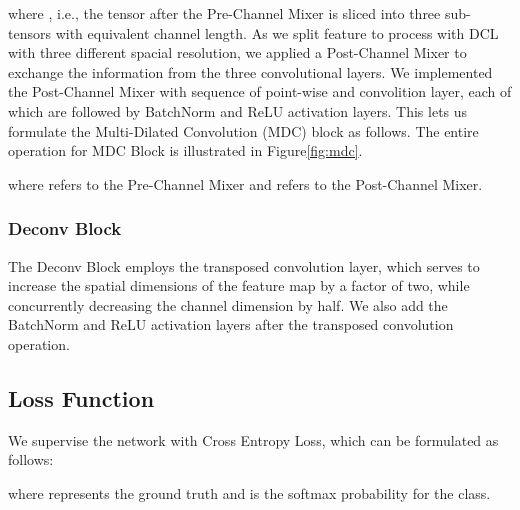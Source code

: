 \documentclass[journal]{IEEEtran}
\begin{document}
where , i.e., the tensor after the Pre-Channel Mixer  is sliced into three sub-tensors with equivalent channel length.
As we split feature to process with DCL with three different spacial resolution, we applied a Post-Channel Mixer to exchange the information from the three convolutional layers. We implemented the Post-Channel Mixer with sequence of point-wise and  convolition layer, each of which are followed by BatchNorm and ReLU activation layers.
This lets us formulate the Multi-Dilated Convolution (MDC) block as follows. The entire operation for MDC Block is illustrated in Figure\ref{fig:mdc}.


where  refers to the Pre-Channel Mixer and  refers to the Post-Channel Mixer. 



\subsubsection{Deconv Block} 
The Deconv Block employs the transposed convolution layer, which serves to increase the spatial dimensions of the feature map by a factor of two, while concurrently decreasing the channel dimension by half. We also add the BatchNorm and ReLU activation layers after the transposed convolution operation.

\subsection{Loss Function}
We supervise the network with Cross Entropy Loss, which can be formulated as follows: 



where  represents the ground truth and  is the softmax probability for the  class.
\end{document}
